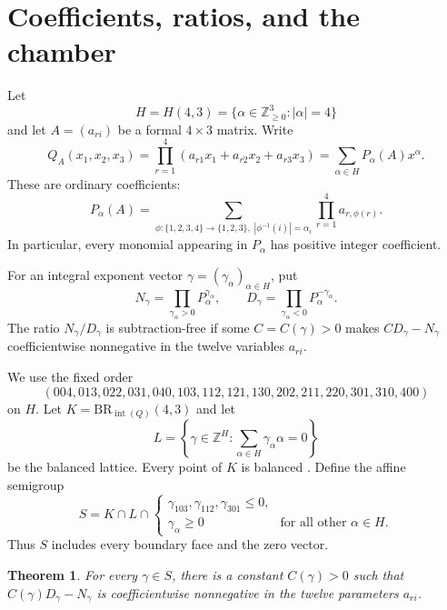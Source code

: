 \documentclass[11pt]{article}
\newtheorem{theorem}{Theorem}
\theoremstyle{definition}
\newcommand{\BRQ}{\mathrm{BR}_{\operatorname{int}(Q)}}
\begin{document}
\section{Coefficients, ratios, and the chamber}

Let
\[
 H=H(4,3)=\{\alpha\in\mathbb Z_{\geq0}^{3}:|\alpha|=4\}
\]
and let $A=(a_{ri})$ be a formal $4\times3$ matrix.  Write
\begin{equation}\label{eq:product}
 Q_A(x_1,x_2,x_3)=\prod_{r=1}^{4}
 (a_{r1}x_1+a_{r2}x_2+a_{r3}x_3)
 =\sum_{\alpha\in H}P_\alpha(A)x^\alpha .
\end{equation}
These are ordinary coefficients:
\begin{equation}\label{eq:assignment}
 P_\alpha(A)=
 \sum_{\phi:\{1,2,3,4\}\to\{1,2,3\},\;|\phi^{-1}(i)|=\alpha_i}
 \prod_{r=1}^{4}a_{r,\phi(r)}.
\end{equation}
In particular, every monomial appearing in $P_\alpha$ has positive integer
coefficient.

For an integral exponent vector $\gamma=(\gamma_\alpha)_{\alpha\in H}$,
put
\[
 N_\gamma=\prod_{\gamma_\alpha>0}P_\alpha^{\gamma_\alpha},
 \qquad
 D_\gamma=\prod_{\gamma_\alpha<0}P_\alpha^{-\gamma_\alpha}.
\]
The ratio $N_\gamma/D_\gamma$ is subtraction-free if some
$C=C(\gamma)>0$ makes $CD_\gamma-N_\gamma$ coefficientwise nonnegative in
the twelve variables $a_{ri}$.

We use the fixed order
\begin{equation}\label{eq:order}
 (004,013,022,031,040,103,112,121,130,202,211,220,301,310,400)
\end{equation}
on $H$.  Let $K=\BRQ(4,3)$ and let
\[
 L=\left\{\gamma\in\mathbb Z^{H}:
       \sum_{\alpha\in H}\gamma_\alpha\alpha=0\right\}
\]
be the balanced lattice.  Every point of $K$ is balanced
\cite{BathijaRohatgiSoskin2026}.  Define the affine semigroup
\begin{equation}\label{eq:semigroup}
 S=K\cap L\cap
 \left\{\begin{array}{ll}
 \gamma_{103},\gamma_{112},\gamma_{301}\leq0,\\
 \gamma_\alpha\geq0&\text{for all other }\alpha\in H.
 \end{array}\right.
\end{equation}
Thus $S$ includes every boundary face and the zero vector.

\begin{theorem}\label{thm:main}
For every $\gamma\in S$, there is a constant $C(\gamma)>0$ such that
$C(\gamma)D_\gamma-N_\gamma$ is coefficientwise nonnegative in the
twelve parameters $a_{ri}$.
\end{theorem}
\end{document}
